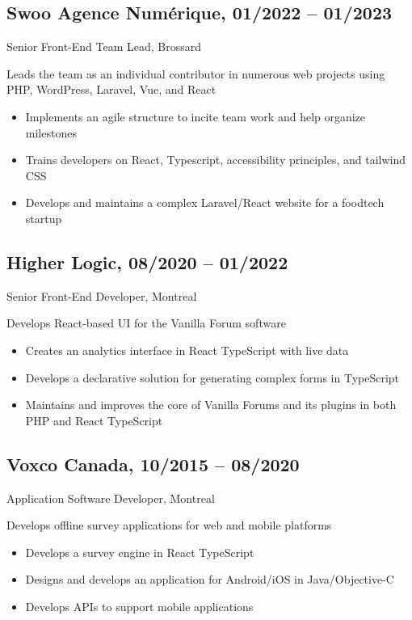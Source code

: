 \documentclass{article}
\begin{document}
\begin{paracol}{2}
\begin{rightcolumn}
    \subsection{Swoo Agence Numérique, 01/2022 -- 01/2023}
    {Senior Front-End Team Lead, Brossard\par}
    {
      Leads the team as an individual contributor in numerous web projects using PHP, WordPress, Laravel, Vue, and React
    \par}
    \begin{itemize}
      \item Implements an agile structure to incite team work and help organize milestones
      \item Trains developers on React, Typescript, accessibility principles, and tailwind CSS
      \item Develops and maintains a complex Laravel/React website for a foodtech startup
    \end{itemize}

    \pagebreak

    \subsection{Higher Logic, 08/2020 -- 01/2022}
    {Senior Front-End Developer, Montreal\par}
    {
      Develops React-based UI for the Vanilla Forum software
    \par}
    \begin{itemize}
      \item Creates an analytics interface in React TypeScript with live data
      \item Develops a declarative solution for generating complex forms in TypeScript
      \item Maintains and improves the core of Vanilla Forums and its plugins in both PHP and React TypeScript
    \end{itemize}

    \vspace{1em}

    \subsection{Voxco Canada, 10/2015 -- 08/2020}
    {Application Software Developer, Montreal\par}
    {
      Develops offline survey applications for web and mobile platforms
    \par}
    \begin{itemize}
      \item Develops a survey engine in React TypeScript
      \item Designs and develops an application for Android/iOS in Java/Objective-C
      \item Develops APIs to support mobile applications
    \end{itemize}


\end{rightcolumn}
\end{paracol}
\end{document}
